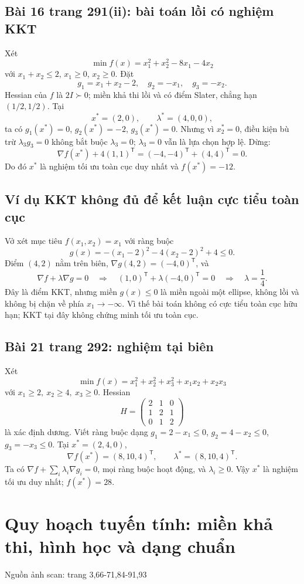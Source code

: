 \documentclass[11pt,a4paper]{article}
\newcommand{\grad}{\nabla}
\newcommand{\T}{^{\mathsf T}}
\newcommand{\src}[1]{\hfill{\footnotesize\color{gray}Nguồn ảnh scan: trang #1}}
\begin{document}
\subsection{Bài 16 trang 291(ii): bài toán lồi có nghiệm KKT}
Xét
\[
\min f(x)=x_1^2+x_2^2-8x_1-4x_2
\]
với \(x_1+x_2\le2\), \(x_1\ge0\), \(x_2\ge0\). Đặt
\[
g_1=x_1+x_2-2,\quad g_2=-x_1,\quad g_3=-x_2.
\]
Hessian của \(f\) là \(2I\succ0\); miền khả thi lồi và có điểm Slater, chẳng hạn \((1/2,1/2)\). Tại
\[
x^*=(2,0),\qquad \lambda^*=(4,0,0),
\]
ta có \(g_1(x^*)=0\), \(g_2(x^*)=-2\), \(g_3(x^*)=0\). Nhưng vì \(x_2^*=0\), điều kiện bù trừ \(\lambda_3g_3=0\) không bắt buộc \(\lambda_3=0\); \(\lambda_3=0\) vẫn là lựa chọn hợp lệ. Dừng:
\[
\grad f(x^*)+4(1,1)\T=( -4,-4)\T+(4,4)\T=0.
\]
Do đó \(x^*\) là nghiệm tối ưu toàn cục duy nhất và \(f(x^*)=-12\).

\subsection{Ví dụ KKT không đủ để kết luận cực tiểu toàn cục}
Vở xét mục tiêu \(f(x_1,x_2)=x_1\) với ràng buộc
\[
g(x)=-(x_1-2)^2-4(x_2-2)^2+4\le0.
\]
Điểm \((4,2)\) nằm trên biên, \(\grad g(4,2)=(-4,0)\T\), và
\[
\grad f+\lambda\grad g=0
\quad\Longrightarrow\quad
(1,0)\T+\lambda(-4,0)\T=0
\quad\Longrightarrow\quad \lambda=\frac14.
\]
Đây là điểm KKT, nhưng miền \(g(x)\le0\) là miền ngoài một ellipse, không lồi và không bị chặn về phía \(x_1\to-\infty\). Vì thế bài toán không có cực tiểu toàn cục hữu hạn; KKT tại đây không chứng minh tối ưu toàn cục.

\subsection{Bài 21 trang 292: nghiệm tại biên}
Xét
\[
\min f(x)=x_1^2+x_2^2+x_3^2+x_1x_2+x_2x_3
\]
với \(x_1\ge2,\ x_2\ge4,\ x_3\ge0\). Hessian
\[
H=\begin{pmatrix}2&1&0\\1&2&1\\0&1&2\end{pmatrix}
\]
là xác định dương. Viết ràng buộc dạng \(g_1=2-x_1\le0\), \(g_2=4-x_2\le0\), \(g_3=-x_3\le0\). Tại \(x^*=(2,4,0)\),
\[
\grad f(x^*)=(8,10,4)\T,\qquad \lambda^*=(8,10,4)\T.
\]
Ta có \(\grad f+\sum_i\lambda_i\grad g_i=0\), mọi ràng buộc hoạt động, và \(\lambda_i\ge0\). Vậy \(x^*\) là nghiệm tối ưu duy nhất; \(f(x^*)=28\).

\section{Quy hoạch tuyến tính: miền khả thi, hình học và dạng chuẩn}
\src{3,66-71,84-91,93}
\end{document}
